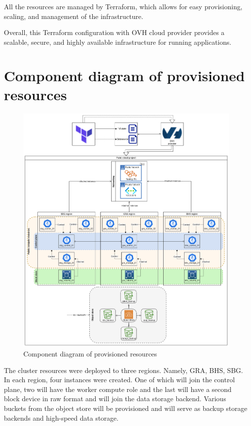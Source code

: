 All the resources are managed by Terraform, which allows for easy provisioning, scaling, and management of the infrastructure. 

Overall, this Terraform configuration with OVH cloud provider provides a scalable, secure, and highly available infrastructure for running applications. 

\section{Component diagram of provisioned resources}

\begin{figure}[H]\centering
\includegraphics[width=1.0\textwidth,angle=00]{assets/f15.png}
\caption{Component diagram of provisioned resources}
\label{fig:fig15}
\end{figure}

The cluster resources were deployed to three regions. Namely, GRA, BHS, SBG. In each region, four instances were created. One of which will join the control plane, two will have the worker compute role and the last will have a second block device in raw format and will join the data storage backend. Various buckets from the object store will be provisioned and will serve as backup storage backends and high-speed data storage.  

